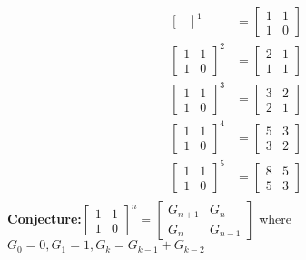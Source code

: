 \documentclass[12pt,letterpaper, onecolumn]{exam}
\begin{document}
\begin{questions}
\begin{solution}
\begin{align*}
\begin{bmatrix}
				\end{bmatrix}^1&=\begin{bmatrix}
				1 & 1\\ 
				1 & 0
				\end{bmatrix}\\
					\begin{bmatrix}
					1 & 1\\ 
					1 & 0
				\end{bmatrix}^2&=\begin{bmatrix}
					2 & 1\\ 
					1 & 1
				\end{bmatrix}\\
					\begin{bmatrix}
					1 & 1\\ 
					1 & 0
				\end{bmatrix}^3&=\begin{bmatrix}
					3 & 2\\ 
					2 & 1
				\end{bmatrix}\\
						\begin{bmatrix}
					1 & 1\\ 
					1 & 0
				\end{bmatrix}^4&=\begin{bmatrix}
					5 & 3\\ 
					3 & 2
				\end{bmatrix}\\
							\begin{bmatrix}
					1 & 1\\ 
					1 & 0
				\end{bmatrix}^5&=\begin{bmatrix}
					8 & 5\\ 
					5 & 3
				\end{bmatrix}\\
			\end{align*}
			\textbf{Conjecture:}$\begin{bmatrix}
				1 & 1\\
				1 & 0
			\end{bmatrix}^n=\begin{bmatrix}
				G_{n+1} & G_{n}\\
				G_{n}& G_{n-1}
			\end{bmatrix}$ where $G_0=0, G_1=1, G_k=G_{k-1}+G_{k-2}$
		\end{solution}
	\end{questions}


	
\end{document}
